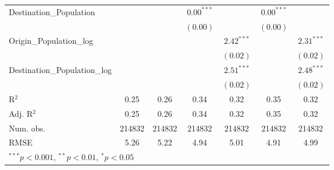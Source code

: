 \begin{table}
\begin{center}
\begin{tabular}{l c c c c c c }
			Destination\_Population      &               &               & $0.00^{***}$  &                & $0.00^{***}$  &                \\
			&               &               & $(0.00)$      &                & $(0.00)$      &                \\
			Origin\_Population\_log      &               &               &               & $2.42^{***}$   &               & $2.31^{***}$   \\
			&               &               &               & $(0.02)$       &               & $(0.02)$       \\
			Destination\_Population\_log &               &               &               & $2.51^{***}$   &               & $2.48^{***}$   \\
			&               &               &               & $(0.02)$       &               & $(0.02)$       \\
			\hline
			R$^2$                        & 0.25          & 0.26          & 0.34          & 0.32           & 0.35          & 0.32           \\
			Adj. R$^2$                   & 0.25          & 0.26          & 0.34          & 0.32           & 0.35          & 0.32           \\
			Num. obs.                    & 214832        & 214832        & 214832        & 214832         & 214832        & 214832         \\
			RMSE                         & 5.26          & 5.22          & 4.94          & 5.01           & 4.91          & 4.99           \\
			\hline
			\multicolumn{7}{l}{\scriptsize{$^{***}p<0.001$, $^{**}p<0.01$, $^*p<0.05$}}
		\end{tabular}

		\label{table:Gravity2014Q3}
	\end{center}
\end{table}



